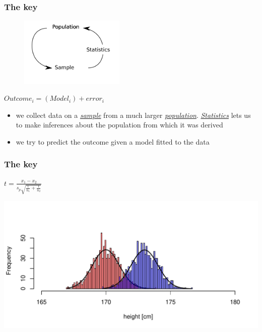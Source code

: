\documentclass{beamer}\usepackage[]{graphicx}\usepackage[]{color}
\makeatletter
\def\maxwidth{ %
  \ifdim\Gin@nat@width>\linewidth
    \linewidth
  \else
    \Gin@nat@width
  \fi
}
\newenvironment{knitrout}{}{} %
\makeatother
\begin{document}
\begin{frame}
\frametitle{The key}
\begin{center}
\begin{figure}
\includegraphics[width=5cm]{Images/stats.png}
\end{figure}
$Outcome_i=(Model_i)+error_i$
\end{center}
\begin{itemize}
\item we collect data on a \underline{\textit{sample}} from a much larger \underline{\textit{population}}. \underline{\textit{Statistics}} lets us to make inferences about the population from which it was derived
\item we try to predict the outcome given a model fitted to the data
\end{itemize}
\end{frame}

\begin{frame}
\frametitle{The key}
\begin{flushright}
$t=\frac{x_1-x_2}{s_p\sqrt{\frac{1}{n_1}+\frac{1}{n_2}}}$
\end{flushright}
\begin{knitrout}
\color{fgcolor}
\includegraphics[width=\maxwidth]{figure/ttest-1} 

\end{knitrout}
\end{frame}
\end{document}
